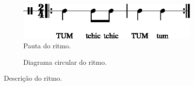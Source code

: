 \begin{figure}[H]
\centering
     \begin{subfigure}[c]{0.45\textwidth}
         \centering
         \includegraphics[width=\textwidth]{chapters/cap-musicalidade-percepcion/treino-ritmo6-1.eps}
         \caption{Pauta do ritmo.}
         \label{fig:Ritmocomplexo2:1}
     \end{subfigure}
     \hfill
     \begin{subfigure}[c]{0.45\textwidth}
         \centering
{}
         \caption{Diagrama circular do ritmo.}
         \label{fig:Ritmocomplexo2:2}
     \end{subfigure}
\caption{Descrição do ritmo.}
\label{fig:abc-percepcionritmica6}
\end{figure}
